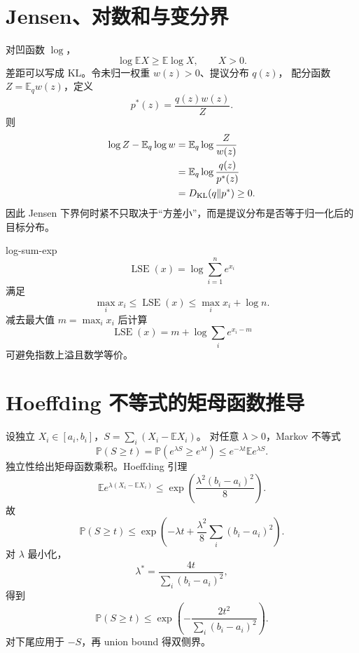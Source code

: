 \documentclass[11pt]{article}
\numberwithin{equation}{section}
\newcommand{\E}{\mathbb{E}}
\newcommand{\Pp}{\mathbb{P}}
\newcommand{\1}{\mathbf{1}}
\begin{document}
\section{Jensen、对数和与变分界}

对凹函数 $\log$，
\begin{equation}
 \log\E X\ge\E\log X,
 \qquad X>0.
\end{equation}
差距可以写成 KL。令未归一权重 $w(z)>0$、提议分布 $q(z)$，
配分函数 $Z=\E_qw(z)$，定义
\begin{equation}
 p^*(z)=\frac{q(z)w(z)}{Z}.
\end{equation}
则
\begin{align}
 \log Z-\E_q\log w
 &=\E_q\log\frac{Z}{w(z)}\\
 &=\E_q\log\frac{q(z)}{p^*(z)}\\
 &=D_{\rm KL}(q\|p^*)\ge0.
\end{align}
因此 Jensen 下界何时紧不只取决于“方差小”，而是提议分布是否等于归一化后的目标分布。

log-sum-exp
\begin{equation}
 \operatorname{LSE}(x)=\log\sum_{i=1}^{n}e^{x_i}
\end{equation}
满足
\begin{equation}
 \max_i x_i\le\operatorname{LSE}(x)
 \le\max_i x_i+\log n.
\end{equation}
减去最大值 $m=\max_ix_i$ 后计算
\begin{equation}
 \operatorname{LSE}(x)=m+\log\sum_ie^{x_i-m}
\end{equation}
可避免指数上溢且数学等价。

\section{Hoeffding 不等式的矩母函数推导}

设独立 $X_i\in[a_i,b_i]$，$S=\sum_i(X_i-\E X_i)$。
对任意 $\lambda>0$，Markov 不等式
\begin{equation}
 \Pp(S\ge t)=\Pp(e^{\lambda S}\ge e^{\lambda t})
 \le e^{-\lambda t}\E e^{\lambda S}.
\end{equation}
独立性给出矩母函数乘积。Hoeffding 引理
\begin{equation}
 \E e^{\lambda(X_i-\E X_i)}
 \le\exp\left(\frac{\lambda^2(b_i-a_i)^2}{8}\right).
\end{equation}
故
\begin{equation}
 \Pp(S\ge t)
 \le\exp\left(-\lambda t+\frac{\lambda^2}{8}
 \sum_i(b_i-a_i)^2\right).
\end{equation}
对 $\lambda$ 最小化，
\begin{equation}
 \lambda^*=\frac{4t}{\sum_i(b_i-a_i)^2},
\end{equation}
得到
\begin{equation}
 \Pp(S\ge t)
 \le\exp\left(-\frac{2t^2}{\sum_i(b_i-a_i)^2}\right).
\end{equation}
对下尾应用于 $-S$，再 union bound 得双侧界。
\end{document}
